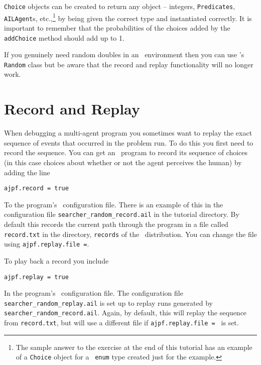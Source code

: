 \documentclass[a4]{article}
\begin{document}
\texttt{Choice} objects can be created to return any object -- integers, \texttt{Predicates}, \texttt{AILAgent}s, etc.,\footnote{The sample answer to the exercise at the end of this tutorial has an example of a \texttt{Choice} object for a \java\ \texttt{enum} type created just for the example.} by being given the correct type and instantiated correctly.  It is important to remember that the probabilities of the choices added by the \texttt{addChoice} method should add up to 1.

If you genuinely need random doubles in an \ail\ environment then you can use \java's \texttt{Random} class but be aware that the record and replay functionality will no longer work.

\section{Record and Replay}
When debugging a multi-agent program you sometimes want to replay the exact sequence of events that occurred in the  problem run.  To do this you first need to record the sequence.  You can get an \ail\ program to record its sequence of choices (in this case choices about whether or not the agent perceives the human) by adding the line

\begin{verbatim}
ajpf.record = true
\end{verbatim}

\begin{sloppypar}
To the program's \ail\ configuration file.  There is an example of this in the configuration file \texttt{searcher\_random\_record.ail} in the tutorial directory.  By default this records the current path through the program in a file called \texttt{record.txt} in the directory, \texttt{records} of the \mcapl\ distribution.  You can change the file using \texttt{ajpf.replay.file =}.  
\end{sloppypar}

To play back a record you include
\begin{verbatim}
ajpf.replay = true
\end{verbatim}
\begin{sloppypar}
In the program's \ail\ configuration file.  The configuration file \texttt{searcher\_random\_replay.ail} is set up to replay runs generated by \texttt{searcher\_random\_record.ail}.  Again, by default, this will replay the sequence from \texttt{record.txt}, but will use a different file if \texttt{ajpf.replay.file = } is set.  
\end{sloppypar}
\end{document}
